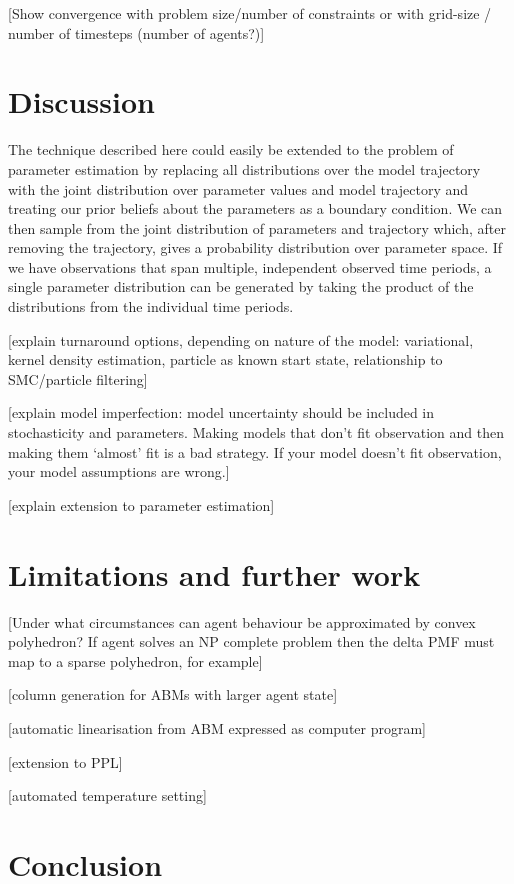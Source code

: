 \documentclass{article}
\begin{document}
[Show convergence with problem size/number of constraints or with grid-size / number of timesteps (number of agents?)]

\section{Discussion} 
\label{discussion}
 The technique described here could easily be extended to the problem of parameter estimation by replacing all distributions over the model trajectory with the joint distribution over parameter values and model trajectory and treating our prior beliefs about the parameters as a boundary condition. We can then sample from the joint distribution of parameters and trajectory which, after removing the trajectory, gives a probability distribution over parameter space. If we have observations that span multiple, independent observed time periods, a single parameter distribution can be generated by taking the product of the distributions from the individual time periods.
 
[explain turnaround options, depending on nature of the model: variational, kernel density estimation, particle as known start state, relationship to SMC/particle filtering]

[explain model imperfection: model uncertainty should be included in stochasticity and parameters. Making models that don't fit observation and then making them `almost' fit is a bad strategy. If your model doesn't fit observation, your model assumptions are wrong.]

[explain extension to parameter estimation]

\section{Limitations and further work}

[Under what circumstances can agent behaviour be approximated by convex polyhedron? If agent solves an NP complete problem then the delta PMF must map to a sparse polyhedron, for example]

[column generation for ABMs with larger agent state]

[automatic linearisation from ABM expressed as computer program]

[extension to PPL]

[automated temperature setting]

\section{Conclusion}
\end{document}
